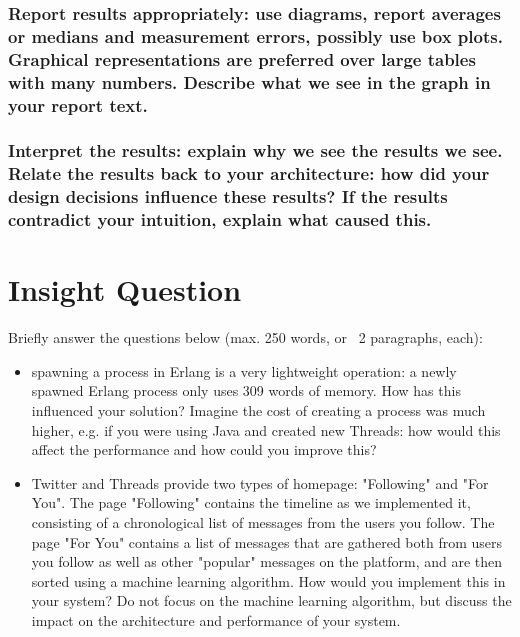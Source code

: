 \documentclass[a4paper]{article}
\begin{document}
\subsubsection{ Report results appropriately: use diagrams, report averages or medians and measurement
errors, possibly use box plots. Graphical representations are preferred over large tables
with many numbers. Describe what we see in the graph in your report text.}


\subsubsection{Interpret the results: explain why we see the results we see. Relate the results back to
your architecture: how did your design decisions influence these results? If the results
contradict your intuition, explain what caused this.}

\section{Insight Question}
Briefly answer the questions below (max. 250 words, or ~2 paragraphs, each):

\begin{itemize}
	\item spawning a process in Erlang is a very lightweight operation: a newly spawned Erlang process only uses 309 words of memory. How has this influenced your solution? Imagine the cost of
creating a process was much higher, e.g. if you were using Java and created new Threads: how
would this affect the performance and how could you improve this?
	\item  Twitter and Threads provide two types of homepage: "Following" and "For You". 
		The page "Following" contains the timeline as we implemented it, consisting of a chronological list of
messages from the users you follow. The page "For You" contains a list of messages that are
gathered both from users you follow as well as other "popular" messages on the platform,
and are then sorted using a machine learning algorithm. How would you implement this in
your system? Do not focus on the machine learning algorithm, but discuss the impact on the
architecture and performance of your system.

\end{itemize}

%
\end{document}
